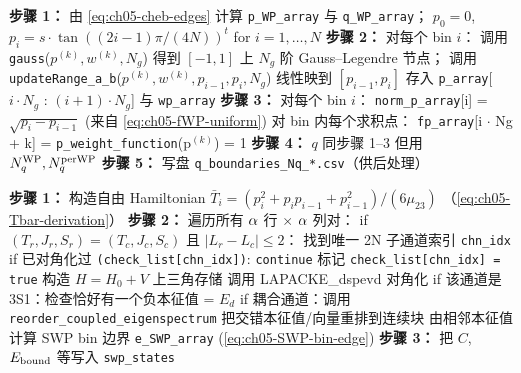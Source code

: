 \begin{algorithm}[H]
\caption{BUILD-WP-GRID：自由波包网格的构造}
\label{alg:ch05-build-wp-grid}
\BlankLine
\textbf{步骤 1：} 由 \cref{eq:ch05-cheb-edges} 计算 \texttt{p\_WP\_array}
                  与 \texttt{q\_WP\_array}；
\(p_0 = 0\), \(p_i = s \cdot \tan((2i-1)\pi/(4N))^t\) for \(i = 1, \ldots, N\)\;
\textbf{步骤 2：} 对每个 bin \(i\)：
\Indp
                  调用 \texttt{gauss}(\(p^{(k)}, w^{(k)}, N_g\))
                  得到 \([-1, 1]\) 上 \(N_g\) 阶 Gauss--Legendre 节点；
                  调用 \texttt{updateRange\_a\_b}(\(p^{(k)}, w^{(k)},
                  p_{i-1}, p_i, N_g\))
                  线性映到 \([p_{i-1}, p_i]\)\;
                  存入 \texttt{p\_array}[\(i \cdot N_g\) : \((i+1) \cdot N_g\)]
                  与 \texttt{wp\_array}\;
\Indm
\textbf{步骤 3：} 对每个 bin \(i\)：
\Indp
                  \texttt{norm\_p\_array}[i] = \(\sqrt{p_i - p_{i-1}}\) (来自 \cref{eq:ch05-fWP-uniform})\;
                  对 bin 内每个求积点：
                  \texttt{fp\_array}[i \(\cdot\) Ng + k] = \texttt{p\_weight\_function}(p\(^{(k)}\)) = 1\;
\Indm
\textbf{步骤 4：} \(q\) 同步骤 1--3 但用 \({N_{q}^{\text{WP}}}, N_q^{\rm per WP}\)\;
\textbf{步骤 5：} 写盘 \texttt{q\_boundaries\_Nq\_*.csv}（供后处理）\;
\Return\;
\end{algorithm}

\BlankLine

\begin{algorithm}[H]
\caption{BUILD-SWP-EIGEN：对每个两体子通道做 \(H\) 块对角化}
\label{alg:ch05-build-swp-eigen}
\BlankLine
\textbf{步骤 1：} 构造自由 Hamiltonian
\(\bar{T}_i = (p_i^2 + p_i p_{i-1} + p_{i-1}^2)/(6\mu_{23})\)
（\cref{eq:ch05-Tbar-derivation}）\;
\textbf{步骤 2：} 遍历所有 \(\alpha\) 行 \(\times\) \(\alpha\) 列对：
\Indp
                  if \((T_r, J_r, S_r) = (T_c, J_c, S_c)\) 且
                     \(|L_r - L_c| \le 2\)：
\Indp
                          找到唯一 2N 子通道索引 \texttt{chn\_idx}\;
                          if 已对角化过 \texttt{(check\_list[chn\_idx])}: \texttt{continue}\;
                          标记 \texttt{check\_list[chn\_idx] = true}\;
                          构造 \(H = H_0 + V\) 上三角存储\;
                          调用 LAPACKE\_dspevd 对角化\;
                          if 该通道是 3S1：检查恰好有一个负本征值 = \(E_d\)\;
                          if 耦合通道：调用 \texttt{reorder\_coupled\_eigenspectrum} 把交错本征值/向量重排到连续块\;
                          由相邻本征值计算 SWP bin 边界 \texttt{e\_SWP\_array} (\cref{eq:ch05-SWP-bin-edge})\;
\Indm
\Indm
\textbf{步骤 3：} 把 \(C\), \(E_{\rm bound}\) 等写入 \texttt{swp\_states}\;
\Return\;
\end{algorithm}

